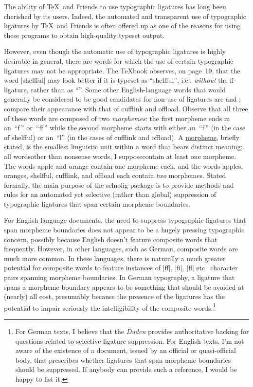 \documentclass[11pt]{article}
\newcommand{\pkg}[1]{\textsf{#1}}
\begin{document}
The ability of \TeX\ and Friends to use typographic ligatures has long been cherished by its users. Indeed, the automated and transparent use of typographic ligatures by \TeX\ and Friends is often offered up as one of the reasons for using these programs to obtain high-quality typeset output.

However, even though the automatic use of typographic ligatures is highly desirable in general, there are words for which the use of certain typographic ligatures may not be appropriate. The \TeX book observes, on page~19, that the word |shelfful| may look better if it is typeset as \enquote{shelfful}, i.e., \emph{without} the ff-ligature, rather than as \enquote{}. Some other English-language words that would generally be considered to be good candidates for non-use of ligatures are  and ; compare their appearance with that of cufflink and offload. Observe that all three of these words are composed of two \emph{morphemes}: the first morpheme ends in an~\enquote{f\,} or~\enquote{ff\,} while the second morpheme starts with either an~\enquote{f\,} (in the case of shelfful) or an~\enquote{l} (in the cases of cufflink and offload). A \href{http://en.wikipedia.org/wiki/Morpheme}{morpheme}, briefly stated, is the smallest linguistic unit within a word that bears distinct meaning; all words\textemdash other than nonsense words, I suppose\textemdash contain at least one morpheme. The words apple and orange contain one morpheme each, and the words apples, oranges, shelfful, cufflink, and offload each contain \emph{two} morphemes. Stated formally, the main purpose of the \pkg{selnolig} package is to provide methods and rules for an automated yet selective (rather than global) suppression of typographic ligatures that span certain morpheme boundaries.

For English language documents, the need to suppress typographic ligatures that span morpheme boundaries does not appear to be a hugely pressing typographic concern, possibly because English doesn't feature composite words that frequently. However, in other languages, such as German, composite words are much more common. In these languages, there is naturally a much greater potential for composite words to feature instances of |ff|, |fi|, |fl| etc.\ character pairs spanning morpheme boundaries. In German typography, a ligature that spans a morpheme boundary appears to be something that should be avoided at (nearly) all cost, presumably because the presence of the ligatures has the potential to impair seriously the intelligibility of the composite words.\footnote{For German texts, I believe that the \emph{Duden} provides authoritative backing for questions related to selective ligature suppression. For English texts, I'm not aware of the existence of a document, issued by an official or quasi-official body, that prescribes whether ligatures that span morpheme boundaries should be suppressed. If anybody can provide such a reference, I would be happy to list it.}
\end{document}
